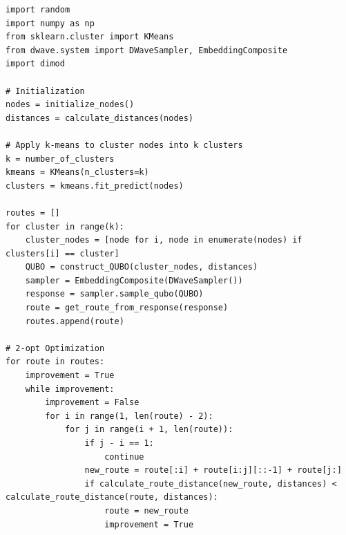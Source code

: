 \documentclass[11pt,a4paper,spanish]{book}
\begin{document}
\begin{lstlisting}
import random
import numpy as np
from sklearn.cluster import KMeans
from dwave.system import DWaveSampler, EmbeddingComposite
import dimod

# Initialization
nodes = initialize_nodes()
distances = calculate_distances(nodes)

# Apply k-means to cluster nodes into k clusters
k = number_of_clusters
kmeans = KMeans(n_clusters=k)
clusters = kmeans.fit_predict(nodes)

routes = []
for cluster in range(k):
    cluster_nodes = [node for i, node in enumerate(nodes) if clusters[i] == cluster]
    QUBO = construct_QUBO(cluster_nodes, distances)
    sampler = EmbeddingComposite(DWaveSampler())
    response = sampler.sample_qubo(QUBO)
    route = get_route_from_response(response)
    routes.append(route)

# 2-opt Optimization
for route in routes:
    improvement = True
    while improvement:
        improvement = False
        for i in range(1, len(route) - 2):
            for j in range(i + 1, len(route)):
                if j - i == 1:
                    continue
                new_route = route[:i] + route[i:j][::-1] + route[j:]
                if calculate_route_distance(new_route, distances) < calculate_route_distance(route, distances):
                    route = new_route
                    improvement = True
\end{lstlisting}
\end{document}
